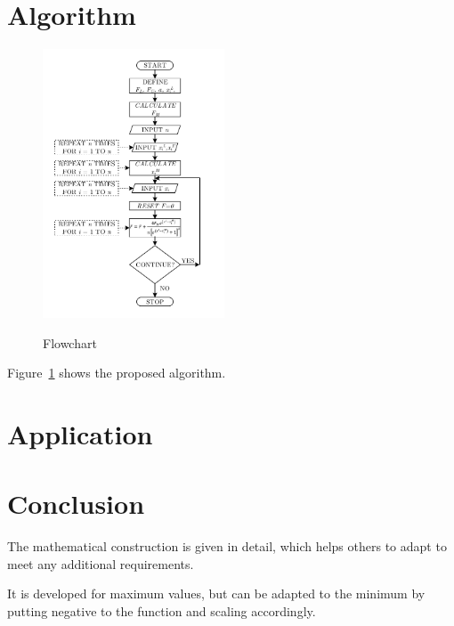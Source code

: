 \documentclass[twocolumn]{svjour3}          %
\begin{document}
\section{Algorithm}
\label{Sec:Algorithm}
\begin{figure}
	\centering
	\includegraphics[width=0.48\textwidth]{images/flow-chart}
	\label{Fig:Flowchart}
	\caption{Flowchart}
\end{figure}
Figure~\ref{Fig:Flowchart} shows the proposed algorithm.
\section{Application}
\label{Sec:Application}
\section{Conclusion}
\label{Sec:Conclusion}
The mathematical construction is given in detail, which helps others to adapt to meet any additional requirements.
\par
It is developed for maximum values, but can be adapted to the minimum by putting negative to the function and scaling accordingly.


\end{document}
